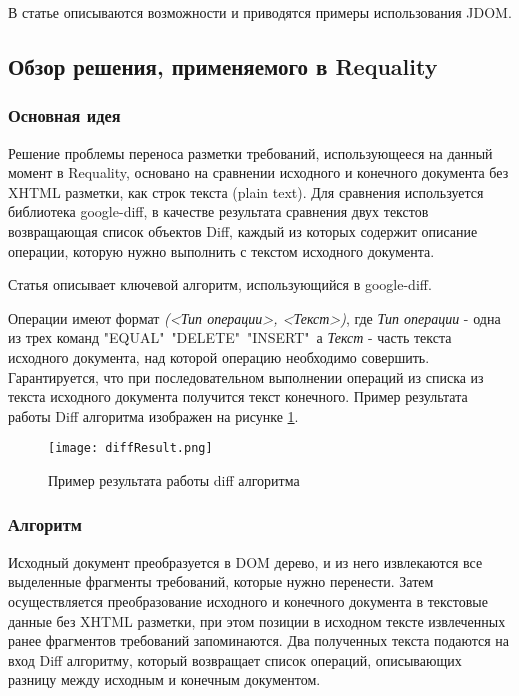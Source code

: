 В статье \cite{web:JDOM} описываются возможности и приводятся примеры использования JDOM.

\subsection{Обзор решения, применяемого в Requality}

\subsubsection{Основная идея}

Решение проблемы переноса разметки требований, использующееся на данный момент в Requality, основано на сравнении исходного и конечного документа без XHTML разметки, как строк текста (plain text). Для сравнения используется библиотека google-diff, в качестве результата сравнения двух текстов возвращающая список объектов Diff, каждый из которых содержит описание операции, которую нужно выполнить с текстом исходного документа.

Статья \cite{web:Diff} описывает ключевой алгоритм, использующийся в google-diff.

Операции имеют формат \emph{(<Тип операции>, <Текст>)}, где \emph{Тип операции} - одна из трех команд "EQUAL"\, "DELETE"\, "INSERT"\, а \emph{Текст} - часть текста исходного документа, над которой операцию необходимо совершить. Гарантируется, что при последовательном выполнении операций из списка из текста исходного документа получится текст конечного. Пример результата работы Diff алгоритма изображен на рисунке \ref{pr:image5}.

\begin{figure}[h]
\begin{center}
\texttt{[image: diffResult.png]}
\caption{Пример результата работы diff алгоритма}
\label{pr:image5}
\end{center}
\end{figure}

\subsubsection{Алгоритм}

Исходный документ преобразуется в DOM дерево, и из него извлекаются все выделенные фрагменты требований, которые нужно перенести. Затем осуществляется преобразование исходного и конечного документа в текстовые данные без XHTML разметки, при этом позиции в исходном тексте извлеченных ранее фрагментов требований запоминаются. Два полученных текста подаются на вход Diff алгоритму, который возвращает список операций, описывающих разницу между исходным и конечным документом.

